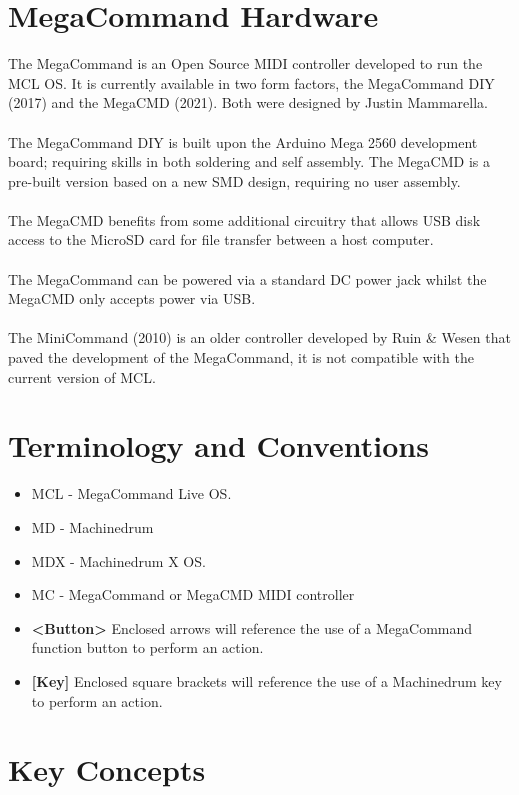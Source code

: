 \chapter{MegaCommand Hardware}
The MegaCommand is an Open Source MIDI controller developed to run the MCL OS. It is currently available in two form factors, the MegaCommand DIY (2017) and the MegaCMD (2021). Both were designed by Justin Mammarella.\\\\
The MegaCommand DIY is built upon the Arduino Mega 2560 development board; requiring skills in both soldering and self assembly. The MegaCMD is a pre-built version based on a new SMD design, requiring no user assembly.\\\\
The MegaCMD benefits from some additional circuitry that allows USB disk access to the MicroSD card for file transfer between a host computer.\\\\
The MegaCommand can be powered via a standard DC power jack whilst the MegaCMD only accepts power via USB.
\\\\
The MiniCommand (2010) is an older controller developed by Ruin \& Wesen that paved the development of the MegaCommand, it is not compatible with the current version of MCL.
\chapter{Terminology and Conventions}
   \begin{itemize}
      \item MCL - MegaCommand Live OS.
      \item MD - Machinedrum
      \item MDX - Machinedrum X OS.
      \item MC - MegaCommand or MegaCMD MIDI controller
      \item \textbf{<Button> } Enclosed arrows will reference the use of a MegaCommand function button to perform an action.
      \item \textbf{[Key] } Enclosed square brackets will reference the use of a Machinedrum key to perform an action. 
   \end{itemize}


\newpage
\chapter{Key Concepts}

